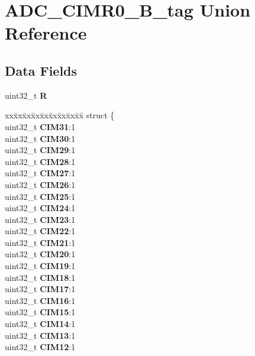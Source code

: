\hypertarget{unionADC__CIMR0__32B__tag}{}\section{A\+D\+C\+\_\+\+C\+I\+M\+R0\+\_\+B\+\_\+tag Union Reference}
\label{unionADC__CIMR0__32B__tag}
\subsection*{Data Fields}
\begin{DoxyCompactItemize}
\item 
\mbox{\label{unionADC__CIMR0__32B__tag_aa34300b1acbe1c89fde20865503b28fd}} 
uint32\+\_\+t {\bfseries R}
\item 
\mbox{\label{unionADC__CIMR0__32B__tag_a18b6a1a4198cfd70e7e5a49ae7f692eb}} 
\begin{tabbing}
xx\=xx\=xx\=xx\=xx\=xx\=xx\=xx\=xx\=\kill
struct \{\\
\>uint32\_t {\bfseries CIM31}:1\\
\>uint32\_t {\bfseries CIM30}:1\\
\>uint32\_t {\bfseries CIM29}:1\\
\>uint32\_t {\bfseries CIM28}:1\\
\>uint32\_t {\bfseries CIM27}:1\\
\>uint32\_t {\bfseries CIM26}:1\\
\>uint32\_t {\bfseries CIM25}:1\\
\>uint32\_t {\bfseries CIM24}:1\\
\>uint32\_t {\bfseries CIM23}:1\\
\>uint32\_t {\bfseries CIM22}:1\\
\>uint32\_t {\bfseries CIM21}:1\\
\>uint32\_t {\bfseries CIM20}:1\\
\>uint32\_t {\bfseries CIM19}:1\\
\>uint32\_t {\bfseries CIM18}:1\\
\>uint32\_t {\bfseries CIM17}:1\\
\>uint32\_t {\bfseries CIM16}:1\\
\>uint32\_t {\bfseries CIM15}:1\\
\>uint32\_t {\bfseries CIM14}:1\\
\>uint32\_t {\bfseries CIM13}:1\\
\>uint32\_t {\bfseries CIM12}:1\\

\end{tabbing}
\end{DoxyCompactItemize}
